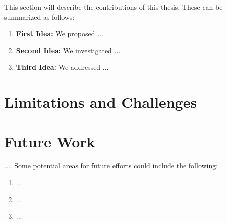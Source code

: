 This section will describe the contributions of this thesis.  These can be summarized as follows:

\begin{enumerate}
      \item \textbf{First Idea:}
            We proposed ...
      \item \textbf{Second Idea:}
            We investigated ...
      \item \textbf{Third Idea:}
            We addressed ...

\end{enumerate}

\section{Limitations and Challenges}
\label{section:limitations}

\section{Future Work}
.... Some potential areas for future efforts could include the following:

\begin{enumerate}
      \item ...
      \item ...
      \item ...

\end{enumerate}

\vfill \strut  %
\cleardoublepage